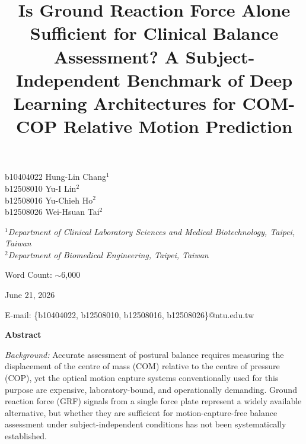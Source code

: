 \documentclass[preprint,12pt]{elsarticle}
\begin{document}
\begin{frontmatter}

\title{Is Ground Reaction Force Alone Sufficient for Clinical Balance Assessment?
       A Subject-Independent Benchmark of Deep Learning Architectures for
       COM-COP Relative Motion Prediction}

\end{frontmatter}

\begin{center}
b10404022 \quad Hung-Lin Chang$^{1}$ \\[6pt]
b12508010 \quad Yu-I Lin$^{2}$ \\[6pt]
b12508016 \quad Yu-Chieh Ho$^{2}$ \\[6pt]
b12508026 \quad Wei-Hsuan Tai$^{2}$
\end{center}

\vspace{1em}
\begin{center}
{\small\itshape
$^{1}$Department of Clinical Laboratory Sciences and Medical Biotechnology, Taipei, Taiwan \\[4pt]
$^{2}$Department of Biomedical Engineering, Taipei, Taiwan}
\end{center}

\vspace{3em}
\begin{center}
Word Count: $\sim$6{,}000
\end{center}

\vspace{2em}
\begin{center}
June 21, 2026
\end{center}

\vspace{2em}
\begin{center}
E-mail: \{b10404022, b12508010, b12508016, b12508026\}@ntu.edu.tw
\end{center}

\clearpage
\begin{center}
  {\normalfont\large\bfseries Abstract}
\end{center}

\noindent\textit{Background:}
Accurate assessment of postural balance requires measuring the displacement of the
centre of mass (COM) relative to the centre of pressure (COP), yet the optical
motion capture systems conventionally used for this purpose are expensive,
laboratory-bound, and operationally demanding.
Ground reaction force (GRF) signals from a single force plate represent a widely
available alternative, but whether they are sufficient for motion-capture-free
balance assessment under subject-independent conditions has not been systematically
established.
\end{document}
